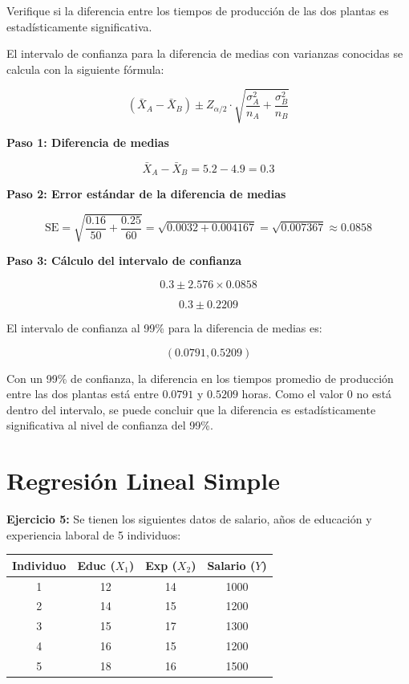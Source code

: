 \documentclass[10pt,a4paper]{article}
\begin{document}
 Verifique si la diferencia entre los tiempos de producción de las dos plantas es estadísticamente significativa.

 {\color{red}
 El intervalo de confianza para la diferencia de medias con varianzas conocidas se calcula con la siguiente fórmula:

 \[
 (\bar{X}_A - \bar{X}_B) \pm Z_{\alpha/2} \cdot \sqrt{\frac{\sigma_A^2}{n_A} + \frac{\sigma_B^2}{n_B}}
\]

{\bf Paso 1: Diferencia de medias}

 \[
 \bar{X}_A - \bar{X}_B = 5.2 - 4.9 = 0.3
 \]

{\bf Paso 2: Error estándar de la diferencia de medias}

 \[
 \text{SE} = \sqrt{\frac{0.16}{50} + \frac{0.25}{60}} = \sqrt{0.0032 + 0.004167} = \sqrt{0.007367} \approx 0.0858
 \]

{\bf Paso 3: Cálculo del intervalo de confianza}

\[
 0.3 \pm 2.576 \times 0.0858
 \]

 \[
 0.3 \pm 0.2209
 \]


 El intervalo de confianza al 99\% para la diferencia de medias es:

\[
(0.0791, 0.5209)
\]


Con un 99\% de confianza, la diferencia en los tiempos promedio de producción entre las dos plantas está entre \(0.0791\) y \(0.5209\) horas. Como el valor 0 no está dentro del intervalo, se puede concluir que la diferencia es estadísticamente significativa al nivel de confianza del 99\%.
}


\section{Regresión Lineal Simple}
\textbf{Ejercicio 5:} Se tienen los siguientes datos de salario, años de educación y experiencia laboral de 5 individuos:
\begin{center}
\begin{tabular}{|c|c|c|c|}
\hline
\textbf{Individuo} & \textbf{Educ} ($X_1$) & \textbf{Exp} ($X_2$)  & \textbf{Salario ($Y$)}\\
\hline
1 & 12 & 14 & 1000 \\
2 & 14 & 15 & 1200 \\
3 & 15 & 17 & 1300 \\
4 & 16 & 15 & 1200 \\
5 & 18 & 16 & 1500 \\
\hline
\end{tabular}
\end{center}
\end{document}
